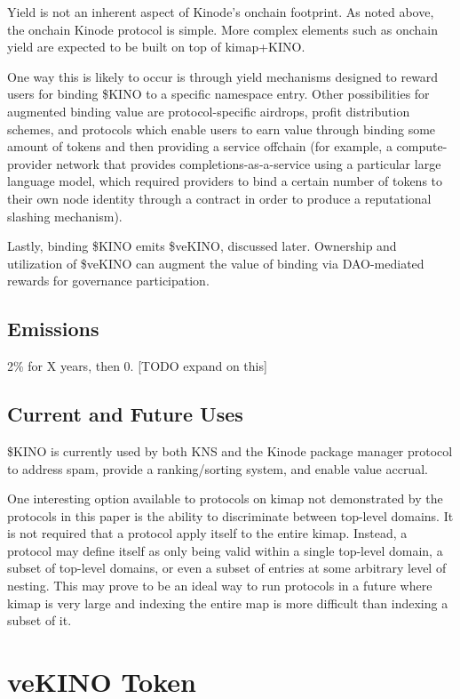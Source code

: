 \documentclass[runningheads]{llncs}
\begin{document}
Yield is not an inherent aspect of Kinode's onchain footprint.
As noted above, the onchain Kinode protocol is simple.
More complex elements such as onchain yield are expected to be built on top of kimap+KINO.

One way this is likely to occur is through yield mechanisms designed to reward users for binding \$KINO to a specific namespace entry. Other possibilities for augmented binding value are protocol-specific airdrops, profit distribution schemes, and protocols which enable users to earn value through binding some amount of tokens and then providing a service offchain (for example, a compute-provider network that provides completions-as-a-service using a particular large language model, which required providers to bind a certain number of tokens to their own node identity through a contract in order to produce a reputational slashing mechanism).

Lastly, binding \$KINO emits \$veKINO, discussed later.
Ownership and utilization of \$veKINO can augment the value of binding via DAO-mediated rewards for governance participation.

\subsection{Emissions}

2\% for X years, then 0. [TODO expand on this]

\subsection{Current and Future Uses}

\$KINO is currently used by both KNS and the Kinode package manager protocol to address spam, provide a ranking/sorting system, and enable value accrual.

One interesting option available to protocols on kimap not demonstrated by the protocols in this paper is the ability to discriminate between top-level domains.
It is not required that a protocol apply itself to the entire kimap.
Instead, a protocol may define itself as only being valid within a single top-level domain, a subset of top-level domains, or even a subset of entries at some arbitrary level of nesting.
This may prove to be an ideal way to run protocols in a future where kimap is very large and indexing the entire map is more difficult than indexing a subset of it.

%
%
%
\section{veKINO Token}
\end{document}
